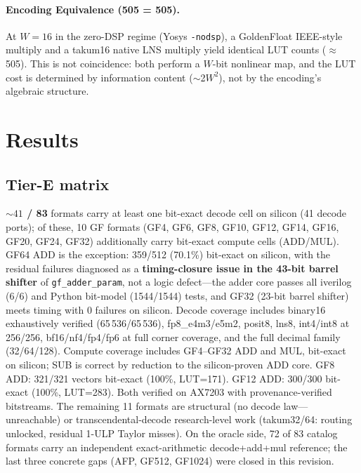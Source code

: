 \documentclass[11pt]{article}
\begin{document}
\paragraph{Encoding Equivalence (505 = 505).}
At $W{=}16$ in the zero-DSP regime (Yosys \texttt{-nodsp}), a GoldenFloat
IEEE-style multiply and a takum16 native LNS multiply yield identical
LUT counts ($\approx$505). This is not coincidence: both perform a
$W$-bit nonlinear map, and the LUT cost is determined by information
content ($\sim$2$W^2$), not by the encoding's algebraic structure.

\section{Results}\label{sec:results}

\subsection{Tier-E matrix}

\textbf{${\sim}41$ / 83} formats carry at least one bit-exact decode cell on
silicon (41 decode ports); of these, 10 GF formats (GF4, GF6, GF8, GF10, GF12,
GF14, GF16, GF20, GF24, GF32) additionally carry bit-exact compute cells
(ADD/MUL). GF64 ADD is the exception: 359/512 (70.1\%) bit-exact on silicon,
with the residual failures diagnosed as a \textbf{timing-closure issue in the
43-bit barrel shifter} of \texttt{gf\_adder\_param}, not a logic defect---the
adder core passes all iverilog (6/6) and Python bit-model (1544/1544) tests,
and GF32 (23-bit barrel shifter) meets timing with 0 failures on silicon.
Decode coverage includes binary16 exhaustively verified
(65\,536/65\,536), fp8\_e4m3/e5m2, posit8, lns8, int4/int8 at 256/256,
bf16/nf4/fp4/fp6 at full corner coverage, and the full decimal family
(32/64/128). Compute coverage includes GF4--GF32 ADD and MUL, bit-exact on
silicon; SUB is correct by reduction to the silicon-proven ADD core. GF8 ADD:
321/321 vectors bit-exact (100\%, LUT=171). GF12 ADD: 300/300 bit-exact
(100\%, LUT=283). Both verified on AX7203 with provenance-verified bitstreams.
The
remaining 11 formats are structural (no decode law---unreachable) or
transcendental-decode research-level work (takum32/64: routing unlocked,
residual 1-ULP Taylor misses). On the oracle side, 72 of 83 catalog formats
carry an independent exact-arithmetic decode+add+mul reference; the last three
concrete gaps (AFP, GF512, GF1024) were closed in this revision.
\end{document}
